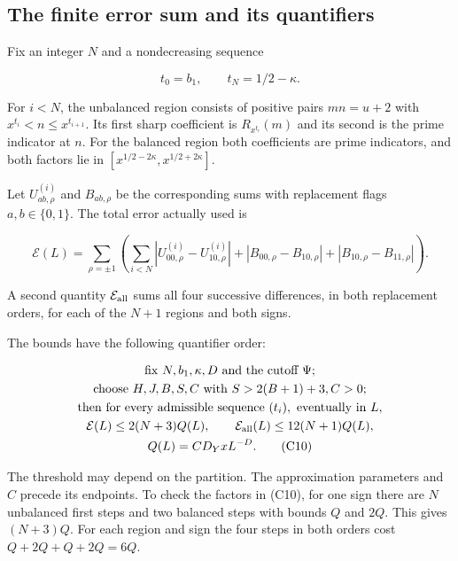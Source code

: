 
\hypertarget{correlation-the-finite-error-sum-and-its-quantifiers}{%
\subsection{The finite error sum and its
quantifiers}\label{correlation-the-finite-error-sum-and-its-quantifiers}}

Fix an integer \(N\) and a nondecreasing sequence

\[
t_0=b_1,\qquad t_N=1/2-\kappa.
\]

For \(i<N\), the unbalanced region consists of positive pairs \(mn=u+2\)
with \(x^{t_i}<n\le x^{t_{i+1}}\). Its first sharp coefficient is
\(R_{x^{t_i}}(m)\) and its second is the prime indicator at \(n\). For
the balanced region both coefficients are prime indicators, and both
factors lie in \([x^{1/2-2\kappa},x^{1/2+2\kappa}]\).

Let \(U^{(i)}_{ab,\rho}\) and \(B_{ab,\rho}\) be the corresponding sums
with replacement flags \(a,b\in\{0,1\}\). The total error actually used
is

\[
\mathcal E(L)=\sum_{\rho=\pm1}\left(
 \sum_{i<N}|U^{(i)}_{00,\rho}-U^{(i)}_{10,\rho}|
 +|B_{00,\rho}-B_{10,\rho}|
 +|B_{10,\rho}-B_{11,\rho}|\right). \tag{C9}
\]

A second quantity \(\mathcal E_{\rm all}\) sums all four successive
differences, in both replacement orders, for each of the \(N+1\) regions
and both signs.

The bounds have the following quantifier order:

\[
\begin{gathered}
\text{fix }N,b_1,\kappa,D\text{ and the cutoff }\Psi;\\
\text{choose }H,J,B,S,C\text{ with }S>2(B+1)+3, C>0;\\
\text{then for every admissible sequence }(t_i),
\text{ eventually in }L,\\
\mathcal E(L)\le2(N+3)Q(L),\qquad
\mathcal E_{\rm all}(L)\le12(N+1)Q(L),\\
Q(L)=C D_Y xL^{-D}. \tag{C10}
\end{gathered}
\]

The threshold may depend on the partition. The approximation parameters
and \(C\) precede its endpoints. To check the factors in (C10), for one
sign there are \(N\) unbalanced first steps and two balanced steps with
bounds \(Q\) and \(2Q\). This gives \((N+3)Q\). For each region and sign
the four steps in both orders cost \(Q+2Q+Q+2Q=6Q\).

